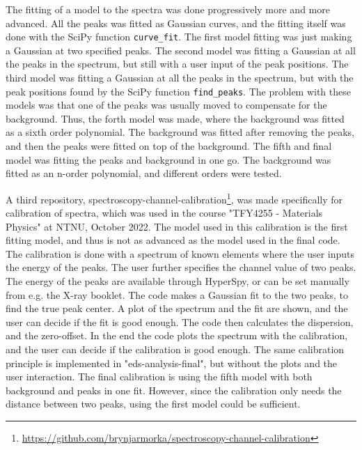 The fitting of a model to the spectra was done progressively more and more advanced.
All the peaks was fitted as Gaussian curves, and the fitting itself was done with the SciPy function \verb|curve_fit|.
The first model fitting was just making a Gaussian at two specified peaks.
The second model was fitting a Gaussian at all the peaks in the spectrum, but still with a user input of the peak positions.
The third model was fitting a Gaussian at all the peaks in the spectrum, but with the peak positions found by the SciPy function \verb|find_peaks|.
The problem with these models was that one of the peaks was usually moved to compensate for the background.
Thus, the forth model was made, where the background was fitted as a sixth order polynomial.
The background was fitted after removing the peaks, and then the peaks were fitted on top of the background.
The fifth and final model was fitting the peaks and background in one go.
The background was fitted as an n-order polynomial, and different orders were tested.



A third repository, spectroscopy-channel-calibration\footnote{\url{https://github.com/brynjarmorka/spectroscopy-channel-calibration}}, was made specifically for calibration of spectra, which was used in the course "TFY4255 - Materials Physics" at NTNU, October 2022.
The model used in this calibration is the first fitting model, and thus is not as advanced as the model used in the final code.
The calibration is done with a spectrum of known elements where the user inputs the energy of the peaks.
The user further specifies the channel value of two peaks.
The energy of the peaks are available through HyperSpy, or can be set manually from e.g. the X-ray booklet.
The code makes a Gaussian fit to the two peaks, to find the true peak center.
A plot of the spectrum and the fit are shown, and the user can decide if the fit is good enough.
The code then calculates the dispersion, and the zero-offset.
In the end the code plots the spectrum with the calibration, and the user can decide if the calibration is good enough.
The same calibration principle is implemented in "eds-analysis-final", but without the plots and the user interaction.
The final calibration is using the fifth model with both background and peaks in one fit.
However, since the calibration only needs the distance between two peaks, using the first model could be sufficient.



